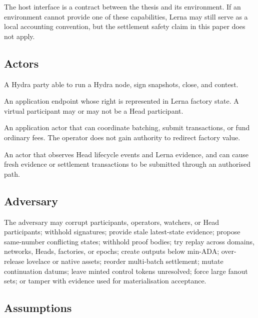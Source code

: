 \documentclass[a4paper,11pt]{article}
\theoremstyle{definition}
\theoremstyle{plain}
\theoremstyle{remark}
\begin{document}
The host interface is a contract between the thesis and its environment. If an
environment cannot provide one of these capabilities, Lerna may still serve as a
local accounting convention, but the settlement safety claim in this paper does
not apply.

\subsection{Actors}
\label{sec:actors}

\begin{description}[leftmargin=2.8cm,style=nextline]
\item[Head participant.]
A Hydra party able to run a Hydra node, sign snapshots, close, and contest.

\item[Virtual participant.]
An application endpoint whose right is represented in Lerna factory state. A
virtual participant may or may not be a Head participant.

\item[Operator.]
An application actor that can coordinate batching, submit transactions, or fund
ordinary fees. The operator does not gain authority to redirect factory value.

\item[Watcher.]
An actor that observes Head lifecycle events and Lerna evidence, and can cause
fresh evidence or settlement transactions to be submitted through an authorised
path.
\end{description}

\subsection{Adversary}
\label{sec:adversary}

The adversary may corrupt participants, operators, watchers, or Head
participants; withhold signatures; provide stale latest-state evidence; propose
same-number conflicting states; withhold proof bodies; try replay across
domains, networks, Heads, factories, or epochs; create outputs below min-ADA;
over-release lovelace or native assets; reorder multi-batch settlement; mutate
continuation datums; leave minted control tokens unresolved; force large
fanout sets; or tamper with evidence used for materialisation acceptance.

\subsection{Assumptions}
\label{sec:assumptions}
\end{document}
